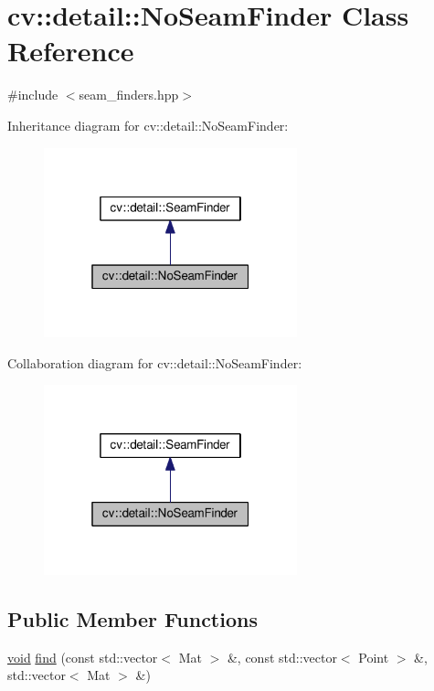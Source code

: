 \hypertarget{classcv_1_1detail_1_1NoSeamFinder}{\section{cv\-:\-:detail\-:\-:No\-Seam\-Finder Class Reference}
\label{classcv_1_1detail_1_1NoSeamFinder}
}


{\ttfamily \#include $<$seam\-\_\-finders.\-hpp$>$}



Inheritance diagram for cv\-:\-:detail\-:\-:No\-Seam\-Finder\-:\nopagebreak
\begin{figure}[H]
\begin{center}
\leavevmode
\includegraphics[width=208pt]{classcv_1_1detail_1_1NoSeamFinder__inherit__graph}
\end{center}
\end{figure}


Collaboration diagram for cv\-:\-:detail\-:\-:No\-Seam\-Finder\-:\nopagebreak
\begin{figure}[H]
\begin{center}
\leavevmode
\includegraphics[width=208pt]{classcv_1_1detail_1_1NoSeamFinder__coll__graph}
\end{center}
\end{figure}
\subsection*{Public Member Functions}
\begin{DoxyCompactItemize}
\item 
\hyperlink{legacy_8hpp_a8bb47f092d473522721002c86c13b94e}{void} \hyperlink{classcv_1_1detail_1_1NoSeamFinder_a37ac911eea1c8bff6609173fd809af51}{find} (const std\-::vector$<$ Mat $>$ \&, const std\-::vector$<$ Point $>$ \&, std\-::vector$<$ Mat $>$ \&)
\end{DoxyCompactItemize}


